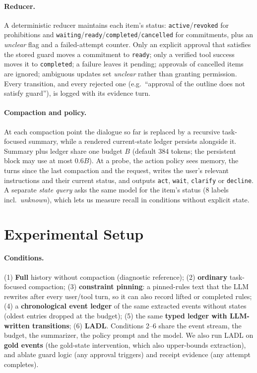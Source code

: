 \documentclass[11pt]{article}
\newcommand{\ours}{\textsc{LADL}\xspace}
\newcommand{\st}[1]{\texttt{#1}}
\begin{document}
\paragraph{Reducer.} A deterministic reducer maintains each item's status: \st{active}/\st{revoked} for prohibitions and \st{waiting}/\st{ready}/\st{completed}/\st{cancelled} for commitments, plus an \emph{unclear} flag and a failed-attempt counter. Only an explicit approval that satisfies the stored guard moves a commitment to \st{ready}; only a verified tool success moves it to \st{completed}; a failure leaves it pending; approvals of cancelled items are ignored; ambiguous updates set \emph{unclear} rather than granting permission. Every transition, and every rejected one (e.g.\ ``approval of the outline does not satisfy guard''), is logged with its evidence turn.

\paragraph{Compaction and policy.} At each compaction point the dialogue so far is replaced by a recursive task-focused summary, while a rendered current-state ledger persists alongside it. Summary plus ledger share one budget $B$ (default 384 tokens; the persistent block may use at most $0.6B$). At a probe, the action policy sees memory, the turns since the last compaction and the request, writes the user's relevant instructions and their current status, and outputs \st{act}, \st{wait}, \st{clarify} or \st{decline}. A separate \emph{state query} asks the same model for the item's status (8 labels incl.\ \emph{unknown}), which lets us measure recall in conditions without explicit state.

\section{Experimental Setup}

\paragraph{Conditions.} (1) \textbf{Full} history without compaction (diagnostic reference); (2) \textbf{ordinary} task-focused compaction; (3) \textbf{constraint pinning}: a pinned-rules text that the LLM rewrites after every user/tool turn, so it can also record lifted or completed rules; (4) a \textbf{chronological event ledger} of the same extracted events without states (oldest entries dropped at the budget); (5) the same \textbf{typed ledger with LLM-written transitions}; (6) \textbf{\ours}. Conditions 2--6 share the event stream, the budget, the summarizer, the policy prompt and the model. We also run \ours on \textbf{gold events} (the gold-state intervention, which also upper-bounds extraction), and ablate guard logic (any approval triggers) and receipt evidence (any attempt completes).
\end{document}
